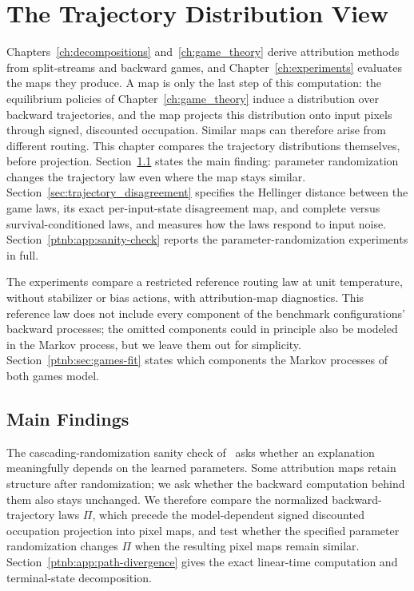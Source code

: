 \chapter{The Trajectory Distribution View}\label{ch:trajectory}

Chapters~\ref{ch:decompositions} and~\ref{ch:game_theory} derive attribution methods from split-streams and backward games, and Chapter~\ref{ch:experiments} evaluates the maps they produce. A map is only the last step of this computation: the equilibrium policies of Chapter~\ref{ch:game_theory} induce a distribution over backward trajectories, and the map projects this distribution onto input pixels through signed, discounted occupation. Similar maps can therefore arise from different routing. This chapter compares the trajectory distributions themselves, before projection. Section~\ref{ptnb:sec:hellinger-sanity} states the main finding: parameter randomization changes the trajectory law even where the map stays similar. Section~\ref{sec:trajectory_disagreement} specifies the Hellinger distance between the game laws, its exact per-input-state disagreement map, and complete versus survival-conditioned laws, and measures how the laws respond to input noise. Section~\ref{ptnb:app:sanity-check} reports the parameter-randomization experiments in full.

The experiments compare a restricted reference routing law at unit temperature, without stabilizer or bias actions, with attribution-map diagnostics. This reference law does not include every component of the benchmark configurations' backward processes; the omitted components could in principle also be modeled in the Markov process, but we leave them out for simplicity. Section~\ref{ptnb:sec:games-fit} states which components the Markov processes of both games model.

\section{Main Findings}\label{ptnb:sec:hellinger-sanity}\label{ptnb:sec:hellinger}

The cascading-randomization sanity check of~\textcite{Adebayo2018sanity} asks whether an explanation meaningfully depends on the learned parameters. Some attribution maps retain structure after randomization; we ask whether the backward computation behind them also stays unchanged. We therefore compare the normalized backward-trajectory laws $\Pi$, which precede the model-dependent signed discounted occupation projection into pixel maps, and test whether the specified parameter randomization changes $\Pi$ when the resulting pixel maps remain similar. Section~\ref{ptnb:app:path-divergence} gives the exact linear-time computation and terminal-state decomposition.

